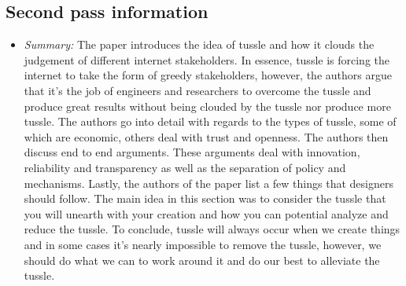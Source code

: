 \documentclass[letterpaper,twocolumn,10pt]{article}
\begin{document}
\subsection{Second pass information}
\label{sec:second}

\begin{itemize}

\item {\it Summary:} 
The paper introduces the idea of tussle and how it clouds the judgement of different internet stakeholders. 
In essence, tussle is forcing the internet to take the form of greedy stakeholders, however, the authors argue
that it's the job of engineers and researchers to overcome the tussle and produce great results without being
clouded by the tussle nor produce more tussle. The authors go into detail with regards to the types of tussle, 
some of which are economic, others deal with trust and openness. The authors then discuss end to end 
arguments. These arguments deal with innovation, reliability and transparency as well as the separation
of policy and mechanisms. Lastly, the authors of the paper list a few things that designers should follow. 
The main idea in this section was to consider the tussle that you will unearth with your creation and how
you can potential analyze and reduce the tussle. To conclude, tussle will always occur when we create 
things and in some cases it's nearly impossible to remove the tussle, however, we should do what we can
to work around it and do our best to alleviate the tussle. 

\end{itemize}
\end{document}
